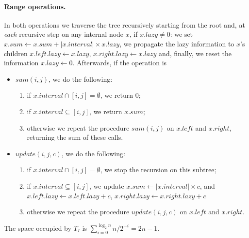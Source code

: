 \paragraph{Range operations.} In both operations we traverse the tree recursively starting from the root and, at \emph{each} recursive step on any internal node $x$, if $x.lazy \neq 0$: we set $x.sum \gets x.sum + |x.interval| \times x.lazy$, we propagate the lazy information to $x$'s children $x.left.lazy \gets x.lazy$, $x.right.lazy \gets x.lazy$ and, finally, we reset the information $x.lazy \gets 0$. Afterwards, if the operation is 
\begin{itemize}
  \item $sum(i,j)$, we do the following:
  \begin{enumerate}
    \item if $x.interval \cap [i,j] = \emptyset$, we return 0;
    \item if $x.interval \subseteq [i,j]$, we return $x.sum$;
    \item otherwise we repeat the procedure $sum(i,j)$ on $x.left$ and $x.right$, returning the sum of these calls.
  \end{enumerate}

  \item $update(i,j,c)$, we do the following:
  \begin{enumerate}
    \item if $x.interval \cap [i,j] = \emptyset$, we stop the recursion on this subtree;
    \item if $x.interval \subseteq [i,j]$, we update $x.sum \gets |x.interval| \times c$, and $x.left.lazy \gets x.left.lazy + c$, $x.right.lazy \gets x.right.lazy + c$
    \item otherwise we repeat the procedure $update(i,j,c)$ on $x.left$ and $x.right$.
  \end{enumerate} 
\end{itemize}
The space occupied by $T_I$ is $\sum_{i=0}^{\log_2 n} n/2^{-i}=2n-1$.
